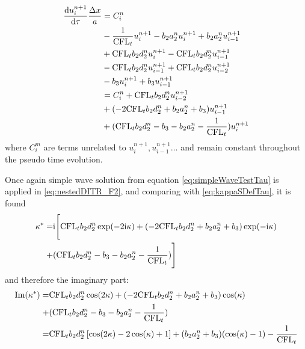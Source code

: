 \documentclass[preprint,12pt]{elsarticle}
\begin{document}
\begin{equation}
    \begin{aligned}
        \frac{\dd u_i^{n+1}}{\dd \tau}\frac{\mathrm\Delta x}{a} & =
        C_i^n                                              \\
                                                       &
        -  \frac{1}{\text{CFL}_t} u_i^{n+1}
        -  b_2a_2^n u_i^{n+1}
        +  b_2a_2^n u_{i-1}^{n+1}
        \\
                                                       &
        + \text{CFL}_t b_2 d_2^n u_i^{n+1}
        - \text{CFL}_t b_2 d_2^n u_{i-1}^{n+1}
        \\
                                                       &
        - \text{CFL}_t b_2 d_2^n u_{i-1}^{n+1}
        + \text{CFL}_t b_2 d_2^n u_{i-2}^{n+1}
        \\
                                                       &
        -b_3 u_i^{n+1}
        +b_3 u_{i-1}^{n+1}
        \\
                                                       &
        =C_i^n  +  \text{CFL}_t b_2 d_2^n u_{i-2}^{n+1}
        \\
                                                       & +
        (-2\text{CFL}_t b_2 d_2^n + b_2a_2^n + b_3)u_{i-1}^{n+1}
        \\
                                                       & +
        (\text{CFL}_t b_2 d_2^n - b_3 - b_2a_2^n -  \frac{1}{\text{CFL}_t})u_i^{n+1}
        \label{eq:nestedDITR_F2}
    \end{aligned}
\end{equation}
where $C_i^m$ are terms unrelated to $u_i^{n+1}, u_{i-1}^{n+1}\dots$
and remain constant throughout the pseudo time evolution.

Once again simple wave solution from equation \eqref{eq:simpleWaveTestTau}
is applied in \eqref{eq:nestedDITR_F2}, and comparing with
\eqref{eq:kappaSDefTau}, it is found
\begin{equation}
    \begin{aligned}
        \kappa^* = & \mathrm{i}
        \Biggl[
            \text{CFL}_t b_2 d_2^n \exp(-2\mathrm{i}\kappa)
            +
            (-2\text{CFL}_t b_2 d_2^n + b_2a_2^n + b_3)\exp(-\mathrm{i}\kappa)
        \\ + &
            (\text{CFL}_t b_2 d_2^n - b_3 - b_2a_2^n -  \frac{1}{\text{CFL}_t})
            \Biggr]
    \end{aligned}
\end{equation}
and therefore the imaginary part:
\begin{equation}
    \begin{aligned}
        \mathrm{Im}(\kappa^*) = &
        \text{CFL}_t b_2 d_2^n \cos(2\kappa)
        +
        (-2\text{CFL}_t b_2 d_2^n + b_2a_2^n + b_3)\cos(\kappa)
        \\ + &
        (\text{CFL}_t b_2 d_2^n - b_3 - b_2a_2^n -  \frac{1}{\text{CFL}_t})
        \\
        =                 &
        \text{CFL}_t b_2 d_2^n \left[\cos(2\kappa) -2\cos(\kappa) + 1\right]
        + (b_2a_2^n + b_3) (\cos(\kappa) - 1) - \frac{1}{\text{CFL}_t}
    \end{aligned}
    \label{eq:imagKsTauDITR}
\end{equation}
\end{document}
